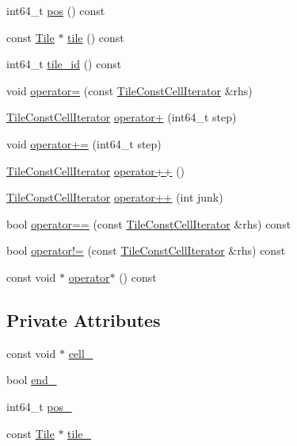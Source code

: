 \begin{DoxyCompactItemize}
\item 
int64\+\_\+t \hyperlink{classTileConstCellIterator_aa39b091d9a4843b1d9b6d24d0f5874be}{pos} () const 
\item 
const \hyperlink{classTile}{Tile} $\ast$ \hyperlink{classTileConstCellIterator_ada2161284f63d76b6e21762d8151875a}{tile} () const 
\item 
int64\+\_\+t \hyperlink{classTileConstCellIterator_a7e4156e41f793dbdcfd3a1872734e8e7}{tile\+\_\+id} () const 
\item 
void \hyperlink{classTileConstCellIterator_a3d7a41840748e50e400729bb5738f332}{operator=} (const \hyperlink{classTileConstCellIterator}{Tile\+Const\+Cell\+Iterator} \&rhs)
\item 
\hyperlink{classTileConstCellIterator}{Tile\+Const\+Cell\+Iterator} \hyperlink{classTileConstCellIterator_abc0e44dd75ed6355951210ce642b63de}{operator+} (int64\+\_\+t step)
\item 
void \hyperlink{classTileConstCellIterator_adcea68a5a1218c29e3c7f230c08ca8a7}{operator+=} (int64\+\_\+t step)
\item 
\hyperlink{classTileConstCellIterator}{Tile\+Const\+Cell\+Iterator} \hyperlink{classTileConstCellIterator_ad092670fd1e28944ee3590240360324f}{operator++} ()
\item 
\hyperlink{classTileConstCellIterator}{Tile\+Const\+Cell\+Iterator} \hyperlink{classTileConstCellIterator_af5123fd804b9912c46ea8f7ab9cde00c}{operator++} (int junk)
\item 
bool \hyperlink{classTileConstCellIterator_ade4b80f0ffe6817095b14cc8c84d1cfa}{operator==} (const \hyperlink{classTileConstCellIterator}{Tile\+Const\+Cell\+Iterator} \&rhs) const 
\item 
bool \hyperlink{classTileConstCellIterator_a07f99d0b7779e921ae7c4d4e6c56b81a}{operator!=} (const \hyperlink{classTileConstCellIterator}{Tile\+Const\+Cell\+Iterator} \&rhs) const 
\item 
const void $\ast$ \hyperlink{classTileConstCellIterator_afde2351af772b404e0eacfce0715c29e}{operator$\ast$} () const 
\end{DoxyCompactItemize}
\subsection*{Private Attributes}
\begin{DoxyCompactItemize}
\item 
const void $\ast$ \hyperlink{classTileConstCellIterator_a222e4e31d47ca9d1b4d1e27a010b578e}{cell\+\_\+}
\item 
bool \hyperlink{classTileConstCellIterator_a10833ee652dacd4e0d7badb9500248d5}{end\+\_\+}
\item 
int64\+\_\+t \hyperlink{classTileConstCellIterator_a088fea6159d4f9f60b6baf003eb573fd}{pos\+\_\+}
\item 
const \hyperlink{classTile}{Tile} $\ast$ \hyperlink{classTileConstCellIterator_a38199eb8498859e5d2450054291516ad}{tile\+\_\+}
\end{DoxyCompactItemize}


